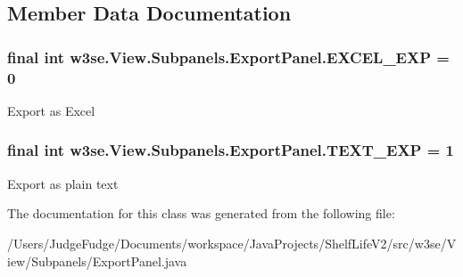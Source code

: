 \subsection{Member Data Documentation}
\hypertarget{classw3se_1_1_view_1_1_subpanels_1_1_export_panel_a4d75ab1837aca747fdf59bd85eef7bb7}{
\subsubsection[{E\-X\-C\-E\-L\-\_\-\-E\-X\-P}]{\setlength{\rightskip}{0pt plus 5cm}final int w3se.\-View.\-Subpanels.\-Export\-Panel.\-E\-X\-C\-E\-L\-\_\-\-E\-X\-P = 0\hspace{0.3cm}{\ttfamily [static]}}}\label{classw3se_1_1_view_1_1_subpanels_1_1_export_panel_a4d75ab1837aca747fdf59bd85eef7bb7}
Export as Excel \hypertarget{classw3se_1_1_view_1_1_subpanels_1_1_export_panel_a84eaaf230a05485b3e8d742d817884d1}{
\subsubsection[{T\-E\-X\-T\-\_\-\-E\-X\-P}]{\setlength{\rightskip}{0pt plus 5cm}final int w3se.\-View.\-Subpanels.\-Export\-Panel.\-T\-E\-X\-T\-\_\-\-E\-X\-P = 1\hspace{0.3cm}{\ttfamily [static]}}}\label{classw3se_1_1_view_1_1_subpanels_1_1_export_panel_a84eaaf230a05485b3e8d742d817884d1}
Export as plain text 

The documentation for this class was generated from the following file\-:\begin{DoxyCompactItemize}
\item 
/\-Users/\-Judge\-Fudge/\-Documents/workspace/\-Java\-Projects/\-Shelf\-Life\-V2/src/w3se/\-View/\-Subpanels/Export\-Panel.\-java\end{DoxyCompactItemize}
